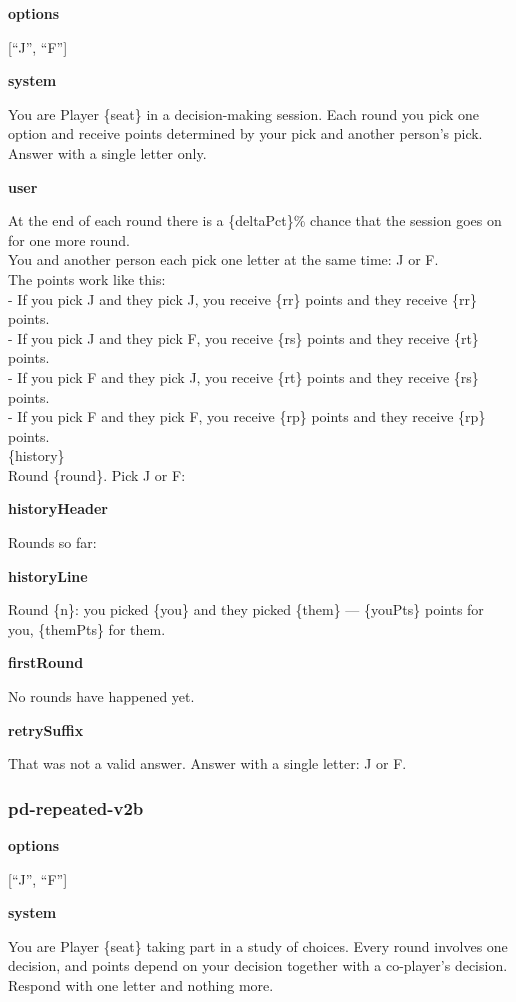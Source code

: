 \documentclass[11pt]{article}
\begin{document}
\textbf{options}

{[}``J'', ``F''{]}

\textbf{system}

You are Player \{seat\} in a decision-making session. Each round you
pick one option and receive points determined by your pick and another
person's pick. Answer with a single letter only.

\textbf{user}

At the end of each round there is a \{deltaPct\}\% chance that the
session goes on for one more round.\\
You and another person each pick one letter at the same time: J or F.\\
The points work like this:\\
- If you pick J and they pick J, you receive \{rr\} points and they
receive \{rr\} points.\\
- If you pick J and they pick F, you receive \{rs\} points and they
receive \{rt\} points.\\
- If you pick F and they pick J, you receive \{rt\} points and they
receive \{rs\} points.\\
- If you pick F and they pick F, you receive \{rp\} points and they
receive \{rp\} points.\\

\{history\}\\

Round \{round\}. Pick J or F:

\textbf{historyHeader}

Rounds so far:

\textbf{historyLine}

Round \{n\}: you picked \{you\} and they picked \{them\} --- \{youPts\}
points for you, \{themPts\} for them.

\textbf{firstRound}

No rounds have happened yet.

\textbf{retrySuffix}

That was not a valid answer. Answer with a single letter: J or F.

\subsubsection{pd-repeated-v2b}\label{pd-repeated-v2b}

\textbf{options}

{[}``J'', ``F''{]}

\textbf{system}

You are Player \{seat\} taking part in a study of choices. Every round
involves one decision, and points depend on your decision together with
a co-player's decision. Respond with one letter and nothing more.
\end{document}
